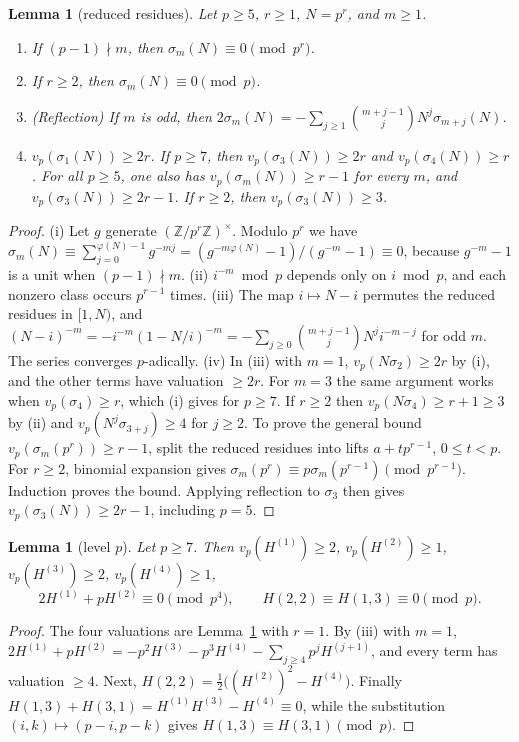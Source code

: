 \documentclass[11pt]{amsart}
\newtheorem{lemma}[theorem]{Lemma}
\theoremstyle{definition}
\theoremstyle{remark}
\newcommand{\Z}{\mathbb{Z}}
\newcommand{\vp}{v_p}
\begin{document}
\begin{lemma}[reduced residues]\label{lem:units}
Let $p\ge5$, $r\ge1$, $N=p^r$, and $m\ge1$.
\begin{enumerate}
\item[(i)] If $(p-1)\nmid m$, then $\sigma_m(N)\equiv 0\pmod{p^r}$.
\item[(ii)] If $r\ge2$, then $\sigma_m(N)\equiv0\pmod p$.
\item[(iii)] (Reflection) If $m$ is odd, then
$2\sigma_m(N)=-\sum_{j\ge1}\binom{m+j-1}{j}N^j\sigma_{m+j}(N)$.
\item[(iv)] $\vp(\sigma_1(N))\ge2r$. If $p\ge7$, then $\vp(\sigma_3(N))\ge 2r$ and $\vp(\sigma_4(N))\ge r$.
For all $p\ge5$, one also has $\vp(\sigma_m(N))\ge r-1$ for every $m$,
and $\vp(\sigma_3(N))\ge2r-1$. If $r\ge2$, then $\vp(\sigma_3(N))\ge3$.
\end{enumerate}
\end{lemma}
\begin{proof}
(i) Let $g$ generate $(\Z/p^r\Z)^\times$. Modulo $p^r$ we have
$\sigma_m(N)\equiv\sum_{j=0}^{\varphi(N)-1}g^{-mj}=(g^{-m\varphi(N)}-1)/(g^{-m}-1)\equiv 0$,
because $g^{-m}-1$ is a unit when $(p-1)\nmid m$.
(ii) $i^{-m}\bmod p$ depends only on $i\bmod p$, and each nonzero class occurs $p^{r-1}$
times.
(iii) The map $i\mapsto N-i$ permutes the reduced residues in $[1,N)$, and
$(N-i)^{-m}=-i^{-m}(1-N/i)^{-m}=-\sum_{j\ge0}\binom{m+j-1}{j}N^ji^{-m-j}$ for odd $m$.
The series converges $p$-adically.
(iv) In (iii) with $m=1$, $\vp(N\sigma_2)\ge 2r$ by (i), and the other terms have valuation
$\ge2r$. For $m=3$ the same argument works when $\vp(\sigma_4)\ge r$, which (i) gives for
$p\ge7$. If $r\ge2$ then $\vp(N\sigma_4)\ge r+1\ge3$ by (ii) and $\vp(N^j\sigma_{3+j})\ge 4$
for $j\ge2$. To prove the general bound $v_p(\sigma_m(p^r))\ge r-1$,
split the reduced residues into lifts $a+tp^{r-1}$, $0\le t<p$.
For $r\ge2$, binomial expansion gives
$\sigma_m(p^r)\equiv p\sigma_m(p^{r-1})\pmod{p^{r-1}}$.
Induction proves the bound. Applying reflection to $\sigma_3$ then gives
$v_p(\sigma_3(N))\ge2r-1$, including $p=5$.
\end{proof}

\begin{lemma}[level $p$]\label{lem:wolst}
Let $p\ge7$. Then $\vp(H^{(1)})\ge2$, $\vp(H^{(2)})\ge1$, $\vp(H^{(3)})\ge2$, $\vp(H^{(4)})\ge1$,
\[
2H^{(1)}+pH^{(2)}\equiv0\pmod{p^4},\qquad H(2,2)\equiv H(1,3)\equiv0\pmod p .
\]
\end{lemma}
\begin{proof}
The four valuations are Lemma~\ref{lem:units} with $r=1$. By (iii) with $m=1$,
$2H^{(1)}+pH^{(2)}=-p^2H^{(3)}-p^3H^{(4)}-\sum_{j\ge4}p^jH^{(j+1)}$, and every term has
valuation $\ge4$. Next, $H(2,2)=\frac12\bigl((H^{(2)})^2-H^{(4)}\bigr)$. Finally
$H(1,3)+H(3,1)=H^{(1)}H^{(3)}-H^{(4)}\equiv0$, while the substitution
$(i,k)\mapsto(p-i,p-k)$ gives $H(1,3)\equiv H(3,1)\pmod p$.
\end{proof}
\end{document}
